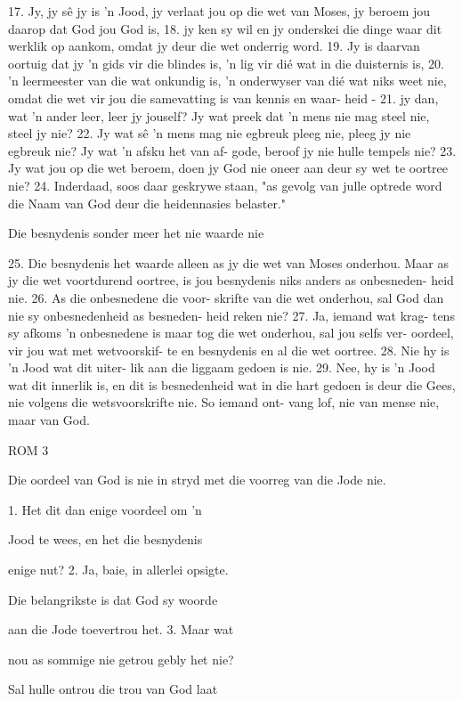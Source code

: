17.  Jy, jy sê jy is 'n Jood, jy verlaat jou op
die wet van Moses, jy beroem jou daarop
dat God jou God is, 18.  jy ken sy wil en jy 
onderskei die dinge waar dit werklik op
aankom, omdat jy deur die wet onderrig
word.  19.  Jy is daarvan oortuig dat jy 'n 
gids vir die blindes is, 'n lig vir dié wat in
die duisternis is, 20.  'n leermeester van die 
wat onkundig is, 'n onderwyser van dié
wat niks weet nie, omdat die wet vir jou 
die samevatting is van kennis en waar-
heid - 21.  jy dan, wat 'n ander leer, leer jy 
jouself?  Jy wat preek dat 'n mens nie mag
steel nie, steel jy nie?  22.  Jy wat sê 'n mens 
mag nie egbreuk pleeg nie, pleeg jy nie 
egbreuk nie?  Jy wat 'n afsku het van af-
gode, beroof jy nie hulle tempels nie?
23.  Jy wat jou op die wet beroem, doen jy 
God nie oneer aan deur sy wet te oortree 
nie?  24.  Inderdaad, soos daar geskrywe 
staan, "as gevolg van julle optrede word
die Naam van God deur die heidennasies
belaster."

Die besnydenis sonder meer het nie
waarde nie

25.  Die besnydenis het waarde alleen as 
jy die wet van Moses onderhou.  Maar as
jy die wet voortdurend oortree, is jou 
besnydenis niks anders as onbesneden-
heid nie.  26.  As die onbesnedene die voor-
skrifte van die wet onderhou, sal God
dan nie sy onbesnedenheid as besneden-
heid reken nie?  27.  Ja, iemand wat krag-
tens sy afkoms 'n onbesnedene is maar 
tog die wet onderhou, sal jou selfs ver-
oordeel, vir jou wat met wetvoorskif-
te en besnydenis en al die wet oortree.
28.  Nie hy is 'n Jood wat dit uiter-
lik aan die liggaam gedoen is nie.  29.  Nee, 
hy is 'n Jood wat dit innerlik is, en 
dit is besnedenheid wat in die hart 
gedoen is deur die Gees, nie volgens
die wetsvoorskrifte nie.  So iemand ont-
vang lof, nie van mense nie, maar van 
God.


ROM 3



Die oordeel van God is nie in stryd met die
voorreg van die Jode nie.  

1.  Het dit dan enige voordeel om 'n 

Jood te wees, en het die besnydenis 

enige nut?  2.  Ja, baie, in allerlei opsigte.  

Die belangrikste is dat God sy woorde 

aan die Jode toevertrou het.  3.  Maar wat 

nou as sommige nie getrou gebly het nie?  

Sal hulle ontrou die trou van God laat 

